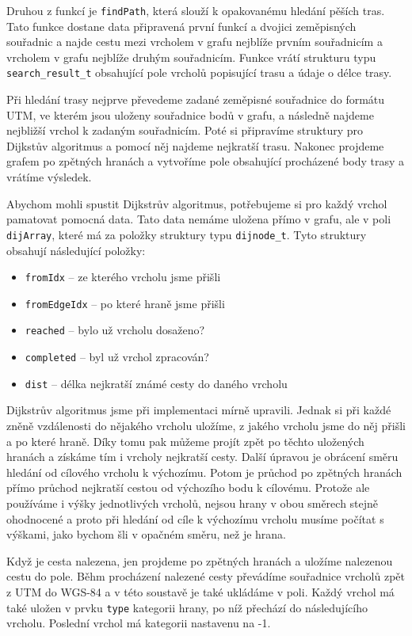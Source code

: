 Druhou z funkcí je \verb|findPath|, která slouží k opakovanému hledání pěších
tras. Tato funkce dostane data připravená první funkcí a dvojici zeměpisných
souřadnic a najde cestu mezi vrcholem v grafu nejblíže prvním souřadnicím a
vrcholem v grafu nejblíže druhým souřadnicím. Funkce vrátí strukturu typu
\verb|search_result_t| obsahující pole vrcholů popisující trasu a údaje o délce
trasy.

Při hledání trasy nejprve převedeme zadané zeměpisné souřadnice do formátu UTM,
ve kterém jsou uloženy souřadnice bodů v grafu, a následně najdeme nejbližší
vrchol k zadaným souřadnicím. Poté si připravíme struktury pro Dijkstův
algoritmus a pomocí něj najdeme nejkratší trasu. Nakonec projdeme grafem po
zpětných hranách a vytvoříme pole obsahující procházené body trasy a vrátíme
výsledek.

Abychom mohli spustit Dijkstrův algoritmus, potřebujeme si pro každý vrchol
pamatovat pomocná data. Tato data nemáme uložena přímo v grafu, ale v poli
\verb|dijArray|, které má za položky struktury typu \verb|dijnode_t|. Tyto
struktury obsahují následující položky:
\begin{itemize}
	\item \verb|fromIdx| -- ze kterého vrcholu jsme přišli 
	\item \verb|fromEdgeIdx| -- po které hraně jsme přišli
	\item \verb|reached| -- bylo už vrcholu dosaženo? 
	\item \verb|completed| -- byl už vrchol zpracován?
	\item \verb|dist| -- délka nejkratší známé cesty do daného vrcholu
\end{itemize}

Dijkstrův algoritmus jsme při implementaci mírně upravili. Jednak si při každé
zněně vzdálenosti do nějakého vrcholu uložíme, z jakého vrcholu jsme do něj
přišli a po které hraně. Díky tomu pak můžeme projít zpět po těchto uložených
hranách a získáme tím i vrcholy nejkratší cesty. Další úpravou je obrácení směru
hledání od cílového vrcholu k výchozímu. Potom je průchod po zpětných hranách
přímo průchod nejkratší cestou od výchozího bodu k cílovému. Protože ale
používáme i výšky jednotlivých vrcholů, nejsou hrany v obou směrech stejně
ohodnocené a proto při hledání od cíle k výchozímu vrcholu musíme počítat s
výškami, jako bychom šli v opačném směru, než je hrana.

Když je cesta nalezena, jen projdeme po zpětných hranách a uložíme nalezenou
cestu do pole. Běhm procházení nalezené cesty převádíme souřadnice vrcholů zpět
z UTM do WGS-84 a v této soustavě je také ukládáme v poli. Každý vrchol má také
uložen v prvku \verb|type| kategorii hrany, po níž přechází do následujícího
vrcholu. Poslední vrchol má kategorii nastavenu na -1.
